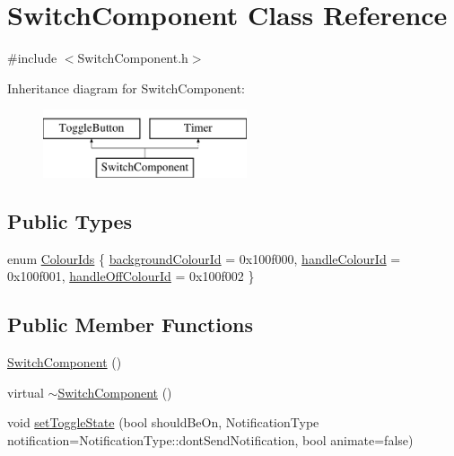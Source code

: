 \hypertarget{classSwitchComponent}{}\section{Switch\+Component Class Reference}
\label{classSwitchComponent}


{\ttfamily \#include $<$Switch\+Component.\+h$>$}

Inheritance diagram for Switch\+Component\+:\begin{figure}[H]
\begin{center}
\leavevmode
\includegraphics[height=2.000000cm]{classSwitchComponent}
\end{center}
\end{figure}
\subsection*{Public Types}
\begin{DoxyCompactItemize}
\item 
enum \mbox{\hyperlink{classSwitchComponent_a13541015fb4340a2f0cfc35dd3ab6c49}{Colour\+Ids}} \{ \mbox{\hyperlink{classSwitchComponent_a13541015fb4340a2f0cfc35dd3ab6c49a2ebf81d753389ad7896afaad1ed2e61f}{background\+Colour\+Id}} = 0x100f000, 
\mbox{\hyperlink{classSwitchComponent_a13541015fb4340a2f0cfc35dd3ab6c49aa8547bc2050e55d566032b770ef8f686}{handle\+Colour\+Id}} = 0x100f001, 
\mbox{\hyperlink{classSwitchComponent_a13541015fb4340a2f0cfc35dd3ab6c49a0cdd0c6f241268bc0dba28bd7b99a9d4}{handle\+Off\+Colour\+Id}} = 0x100f002
 \}
\end{DoxyCompactItemize}
\subsection*{Public Member Functions}
\begin{DoxyCompactItemize}
\item 
\mbox{\hyperlink{classSwitchComponent_a5d01699ad877451e51da9875ebb3bd17}{Switch\+Component}} ()
\item 
virtual \mbox{\hyperlink{classSwitchComponent_ad8969a140f71dc9d31703d29d4ad79a3}{$\sim$\+Switch\+Component}} ()
\item 
void \mbox{\hyperlink{classSwitchComponent_a61613078c9c4215a806563ed447d3f67}{set\+Toggle\+State}} (bool should\+Be\+On, Notification\+Type notification=Notification\+Type\+::dont\+Send\+Notification, bool animate=false)
\end{DoxyCompactItemize}


